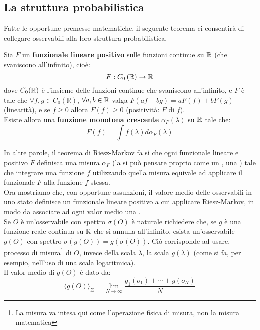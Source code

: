 \documentclass[FisicaTeorica.tex]{subfiles}
\begin{document}
\subsection{La struttura probabilistica}
Fatte le opportune premesse matematiche, il seguente teorema ci consentirà di collegare osservabili alla loro struttura probabilistica.
\begin{thm}
Sia $F$ un \textbf{funzionale lineare positivo} sulle funzioni continue su $\mathbb{R}$ (che svaniscono all'infinito), cioè:
\[
F:C_0\left(\mathbb{R}\right)\to \mathbb{R} 
\]
dove $C_0(\mathbb{R})$ è l'insieme delle funzioni continue che svaniscono all'infinito, e $F$ è tale che $\forall f,g\in C_0\left(\mathbb{R}\right)$, $\forall a,b\in \mathbb{R}$ valga $F\left(af+bg\right)=aF\left(f\right)+bF(g)$ (linearità), e se $f\geq 0$ allora $F\left(f\right)\geq 0$ (positività: $F$  di $f$).\\
Esiste allora una \textbf{funzione monotona crescente} $\alpha_F\left(\lambda\right)$ su $\mathbb{R}$ tale che: 
\[
F\left(f\right)=\int f\left(\lambda\right)d\alpha_F\left(\lambda\right)
\]
\end{thm}
In altre parole, il teorema di Riesz-Markov fa sì che ogni funzionale lineare e positivo $F$ definisca una misura $\alpha_F$ (la si può pensare proprio come un , una ) tale che integrare una funzione $f$ utilizzando quella misura equivale ad applicare il funzionale $F$ alla funzione $f$ stessa.\\
Ora mostriamo che, con opportune assunzioni, il valore medio delle osservabili in uno stato definisce un funzionale lineare positivo a cui applicare Riesz-Markov, in modo da associare ad ogni valor medio una .\\
Se $O$ è un'osservabile con spettro $\sigma \left(O\right)$ è naturale richiedere che, se $g$ è una funzione reale continua su $\mathbb{R}$ che si annulla all'infinito, esista un'osservabile $g(O)$ con spettro $\sigma \left(g\left(O\right)\right)=g\left(\sigma\left(O\right)\right)$. Ciò corrisponde ad usare,  processo di misura\footnote{La misura va intesa qui come l'operazione fisica di misura, non la misura matematica} di $O$, invece della scala $\lambda$, la scala $g\left(\lambda\right)$ (come si fa, per esempio, nell'uso di una scala logaritmica).\\
Il valor medio di $g(O)$ è dato da:
\begin{equation}
\langle g (O)\rangle_\Sigma = \lim_{N\to\infty} \frac{g_1(o_1) + \cdots + g(o_N)}{N}
    \label{eqn:medio-g}
\end{equation}
\end{document}

